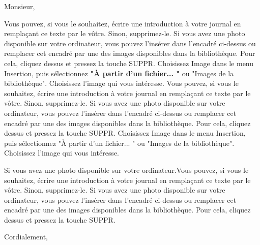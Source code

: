 \documentclass[10pt]{letter}
\date{Lausanne, le 19 février 2020}
\begin{document}
\subject{Concerne: commodo consequat}
Monsieur,

Vous pouvez, si vous le souhaitez, écrire une introduction à votre journal en remplaçant ce texte par le vôtre. Sinon, supprimez-le. Si vous avez une photo disponible sur votre ordinateur, vous pouvez l'insérer dans l'encadré ci-dessus ou remplacer cet encadré par une des images disponibles dans la bibliothèque. Pour cela, cliquez dessus et pressez la touche SUPPR. Choisissez Image dans le menu Insertion, puis sélectionnez \textbf{"À partir d'un fichier... "} ou "Images de la bibliothèque". Choisissez l'image qui vous intéresse. 
Vous pouvez, si vous le souhaitez, écrire une introduction à votre journal en remplaçant ce texte par le vôtre. Sinon, supprimez-le. Si vous avez une photo disponible sur votre ordinateur, vous pouvez l'insérer dans l'encadré ci-dessus ou remplacer cet encadré par une des images disponibles dans la bibliothèque. Pour cela, cliquez dessus et pressez la touche SUPPR. Choisissez Image dans le menu Insertion, puis sélectionnez "À partir d'un fichier... " ou "Images de la bibliothèque". Choisissez l'image qui vous intéresse.

Si vous avez une photo disponible sur votre ordinateur.Vous pouvez, si vous le souhaitez, écrire une introduction à votre journal en remplaçant ce texte par le vôtre. Sinon, supprimez-le. Si vous avez une photo disponible sur votre ordinateur, vous pouvez l'insérer dans l'encadré ci-dessus ou remplacer cet encadré par une des images disponibles dans la bibliothèque. Pour cela, cliquez dessus et pressez la touche SUPPR.

Cordialement,
\signature{Lukas Baumgartner}
\end{document}
